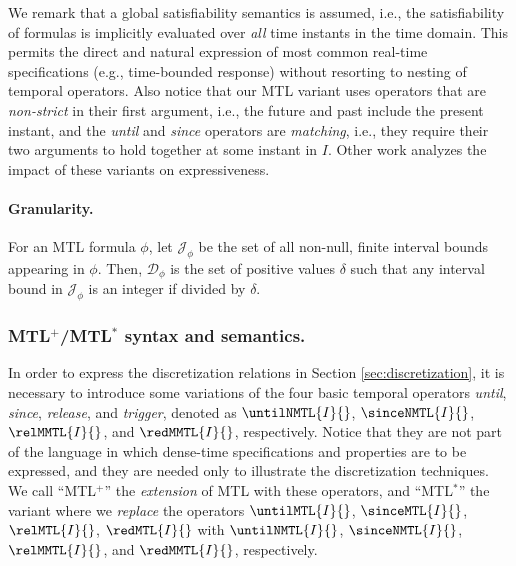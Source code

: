 \documentclass[a4paper]{article}
\newcommand{\mtlplus}{MTL$^+$}
\newcommand{\mtlstar}{MTL$^*$}
\newcommand{\Jcal}{\mathcal{J}}
\newcommand{\Dcal}{\mathcal{D}}
\theoremstyle{plain}
\theoremstyle{definition}
\begin{document}
We remark that a global satisfiability semantics is assumed, i.e., the satisfiability of formulas is implicitly evaluated over \emph{all} time instants in the time domain.
This permits the direct and natural expression of most common real-time specifications (e.g., time-bounded response) without resorting to nesting of temporal operators.
Also notice that our MTL variant uses operators that are \emph{non-strict} in their first argument, i.e., the future and past include the present instant, and the \emph{until} and \emph{since} operators are \emph{matching}, i.e., they require their two arguments to hold together at some instant in $I$.
Other work \cite{FR07-FORMATS07} analyzes the impact of these variants on expressiveness.


\paragraph{Granularity.}
For an MTL formula $\phi$, let $\Jcal_{\phi}$ be the set of all non-null, finite interval bounds appearing in $\phi$.
Then, $\Dcal_\phi$ is the set of positive values $\delta$ such that any interval bound in $\Jcal_{\phi}$ is an integer if divided by $\delta$.





\subsubsection{\mtlplus{}/\mtlstar{} syntax and semantics.}
In order to express the discretization relations in Section \ref{sec:discretization}, it is necessary to introduce some variations of the four basic temporal operators \emph{until}, \emph{since}, \emph{release}, and \emph{trigger}, denoted as $\untilNMTL{I}{}$, $\sinceNMTL{I}{}$, $\relMMTL{I}{}$, and $\redMMTL{I}{}$, respectively.
Notice that they are not part of the language in which dense-time specifications and properties are to be expressed, and they are needed only to illustrate the discretization techniques.
We call ``\mtlplus{}'' the \emph{extension} of MTL with these operators, and ``\mtlstar{}'' the variant where we \emph{replace} the operators $\untilMTL{I}{}$, $\sinceMTL{I}{}$, $\relMTL{I}{}$, $\redMTL{I}{}$ with $\untilNMTL{I}{}$, $\sinceNMTL{I}{}$, $\relMMTL{I}{}$, and $\redMMTL{I}{}$, respectively.
\end{document}
